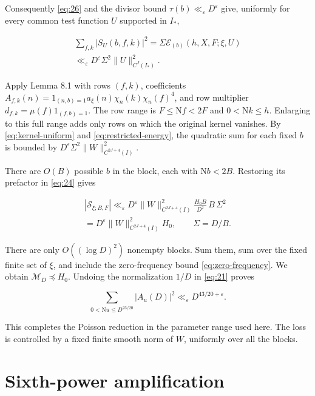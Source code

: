 \documentclass[reqno,a4paper,11pt]{amsart}
\begin{document}
Consequently \eqref{eq:26} and the divisor bound $\tau(b)\ll_\varepsilon D^{\varepsilon}$ give, uniformly for every common test function $U$ supported in $I_*$,

\begin{equation}\label{eq:restricted-energy}
\begin{gathered}
\sum_{f,k}|S_U(b,f,k)|^2=\Sigma\mathcal{E}_{(b)}(h,X,F;\xi,U) \\ \ll_\varepsilon D^{\varepsilon}\Sigma^2\|U\|_{C^J(I_*)}^2.
\end{gathered}
\end{equation}

Apply Lemma 8.1 with rows $(f,k)$, coefficients $A_{f,k}(n)=1_{(n,b)=1}a_\xi(n)\chi_n(k)\chi_n(f)^4$, and row multiplier $d_{f,k}=\mu(f)1_{(f,b)=1}$. The row range is $F\le\mathrm{N}f<2F$ and $0<\mathrm{N}k\le h$. Enlarging to this full range adds only rows on which the original kernel vanishes. By \eqref{eq:kernel-uniform} and \eqref{eq:restricted-energy}, the quadratic sum for each fixed $b$ is bounded by $D^{\varepsilon}\Sigma^2\|W\|_{C^{2J+4}(I)}^2$.

There are $O(B)$ possible $b$ in the block, each with $\mathrm{N}b<2B$. Restoring its prefactor in \eqref{eq:24} gives

\begin{equation}\label{eq:block-bound}
\begin{gathered}
|\mathcal{S}_{\xi;B,F}|\ll_\varepsilon D^{\varepsilon}\|W\|_{C^{2J+4}(I)}^2\frac{H_0B}{D^2}\,B\,\Sigma^2 \\ =D^{\varepsilon}\|W\|_{C^{2J+4}(I)}^2H_0,\qquad\Sigma=D/B.
\end{gathered}
\end{equation}

There are only $O((\log D)^2)$ nonempty blocks. Sum them, sum over the fixed finite set of $\xi$, and include the zero-frequency bound \eqref{eq:zero-frequency}. We obtain $\mathcal{M}_D\preccurlyeq H_0$. Undoing the normalization $1/D$ in \eqref{eq:21} proves

\begin{equation}\label{eq:28}
\sum_{0<\mathrm{N}u\le D^{23/20}}|A_u(D)|^2\ll_\varepsilon D^{43/20+\varepsilon}.
\end{equation}

This completes the Poisson reduction in the parameter range used here. The loss is controlled by a fixed finite smooth norm of $W$, uniformly over all the blocks.

\section{Sixth-power amplification}
\end{document}

